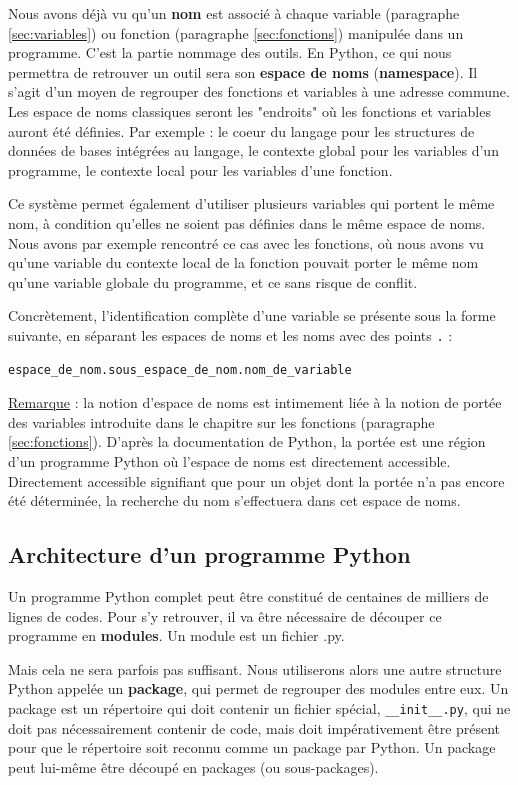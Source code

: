 \documentclass[12pt, a4paper]{article}
\begin{document}
Nous avons déjà vu qu'un \textbf{nom} est associé à chaque variable (paragraphe \ref{sec:variables}) ou fonction (paragraphe \ref{sec:fonctions}) manipulée dans un programme. C'est la partie nommage des outils. En Python, ce qui nous permettra de retrouver un outil sera son \textbf{espace de noms} (\textbf{namespace}). Il s'agit d'un moyen de regrouper des fonctions et variables à une adresse commune. Les espace de noms classiques seront les "endroits" où les fonctions et variables auront été définies. Par exemple : le coeur du langage pour les structures de données de bases intégrées au langage, le contexte global pour les variables d'un programme, le contexte local pour les variables d'une fonction.

Ce système permet également d'utiliser plusieurs variables qui portent le même nom, à condition qu'elles ne soient pas définies dans le même espace de noms. Nous avons par exemple rencontré ce cas avec les fonctions, où nous avons vu qu'une variable du contexte local de la fonction pouvait porter le même nom qu'une variable globale du programme, et ce sans risque de conflit.

Concrètement, l'identification complète d'une variable se présente sous la forme suivante, en séparant les espaces de noms et les noms avec des points \lstinline{.} :
\begin{lstlisting}
espace_de_nom.sous_espace_de_nom.nom_de_variable
\end{lstlisting}

\underline{Remarque} : la notion d'espace de noms est intimement liée à la notion de portée des variables introduite dans le chapitre sur les fonctions (paragraphe \ref{sec:fonctions}). D'après la documentation de Python, la portée est une région d'un programme Python où l'espace de noms est directement accessible. Directement accessible signifiant que pour un objet dont la portée n'a pas encore été déterminée, la recherche du nom s'effectuera dans cet espace de noms.


\subsection{Architecture d'un programme Python}
Un programme Python complet peut être constitué de centaines de milliers de lignes de codes. Pour s'y retrouver, il va être nécessaire de découper ce programme en \textbf{modules}. Un module est un fichier .py. 

Mais cela ne sera parfois pas suffisant. Nous utiliserons alors une autre structure Python appelée un \textbf{package}, qui permet de regrouper des modules entre eux. Un package est un répertoire qui doit contenir un fichier spécial, \lstinline{__init__.py}, qui ne doit pas nécessairement contenir de code, mais doit impérativement être présent pour que le répertoire soit reconnu comme un package par Python. Un package peut lui-même être découpé en packages (ou sous-packages).
\end{document}
